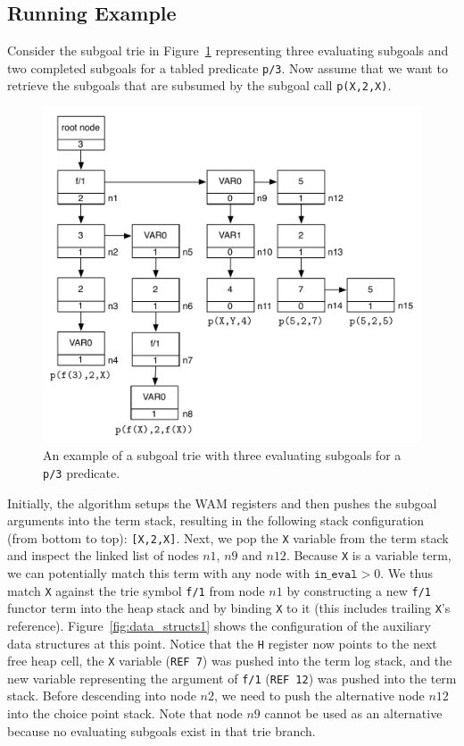 \subsection{Running Example}

Consider the subgoal trie in Figure~\ref{fig:example_trie} representing
three evaluating subgoals and two completed subgoals for a tabled
predicate \texttt{p/3}. Now assume that we want to retrieve the subgoals that
are subsumed by the subgoal call \texttt{p(X,2,X)}.

\begin{figure}[ht]
\centering
\includegraphics[scale=0.6]{example_trie}
\caption{An example of a subgoal trie with three evaluating subgoals for a \texttt{p/3} predicate.}
\label{fig:example_trie}
\end{figure}

Initially, the algorithm setups the WAM registers and then pushes the
subgoal arguments into the term stack, resulting in the following
stack configuration (from bottom to top): \texttt{[X,2,X]}. Next, we pop the
\texttt{X} variable from the term stack and inspect the linked list of nodes
$n1$, $n9$ and $n12$. Because \texttt{X} is a variable term, we can
potentially match this term with any node with $\texttt{in\_eval} > 0$. We thus
match \texttt{X} against the trie symbol \texttt{f/1} from node $n1$ by constructing
a new \texttt{f/1} functor term into the heap stack and by binding \texttt{X} to it
(this includes trailing \texttt{X}'s
reference). Figure~\ref{fig:data_structs1} shows the configuration of
the auxiliary data structures at this point. Notice that the \texttt{H}
register now points to the next free heap cell, the \texttt{X} variable
(\texttt{REF~7}) was pushed into the term log stack, and the new variable
representing the argument of \texttt{f/1} (\texttt{REF~12}) was pushed into the term
stack. Before descending into node $n2$, we need to push the
alternative node $n12$ into the choice point stack. Note that node
$n9$ cannot be used as an alternative because no evaluating subgoals
exist in that trie branch.

